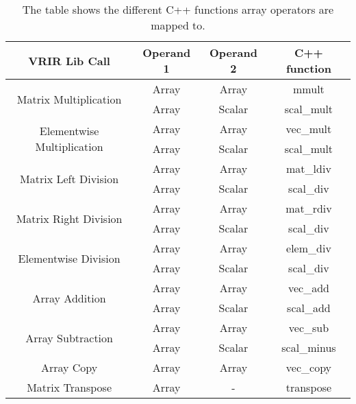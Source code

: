 \begin{table}[h]
\centering
\begin{tabular}{|c|c|c|c|}
\hline
VRIR Lib Call                               & Operand 1 & Operand 2 & C++ function \\ \hline
\multirow{2}{*}{Matrix Multiplication}      & Array     & Array     & mmult        \\ \cline{2-4} 
                                            & Array     & Scalar    & scal\_mult   \\ \hline
\multirow{2}{*}{Elementwise Multiplication} & Array     & Array     & vec\_mult    \\ \cline{2-4} 
                                            & Array     & Scalar    & scal\_mult   \\ \hline
\multirow{2}{*}{Matrix Left Division}       & Array     & Array     & mat\_ldiv    \\ \cline{2-4} 
                                            & Array     & Scalar    & scal\_div    \\ \hline
\multirow{2}{*}{Matrix Right Division}      & Array     & Array     & mat\_rdiv    \\ \cline{2-4} 
                                            & Array     & Scalar    & scal\_div    \\ \hline
\multirow{2}{*}{Elementwise Division}       & Array     & Array     & elem\_div    \\ \cline{2-4} 
                                            & Array     & Scalar    & scal\_div    \\ \hline
\multirow{2}{*}{Array Addition}             & Array     & Array     & vec\_add     \\ \cline{2-4} 
                                            & Array     & Scalar    & scal\_add    \\ \hline
\multirow{2}{*}{Array Subtraction}          & Array     & Array     & vec\_sub     \\ \cline{2-4} 
                                            & Array     & Scalar    & scal\_minus  \\ \hline
Array Copy                                  & Array     & Array     & vec\_copy    \\ \hline
Matrix Transpose                            & Array     & -         & transpose    \\ \hline
\end{tabular}
\caption[List of operations on Arrays]{The table shows the different C++ functions array operators are mapped to. }
\label{tab:arrayOpMap}
\end{table}
